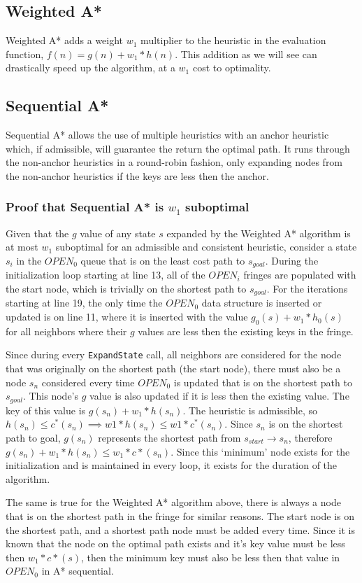 \documentclass[11pt,letter]{article}
\begin{document}
\subsection{Weighted A*}
Weighted A* adds a weight $w_1$ multiplier to the heuristic in the evaluation function, $f(n) = g(n) + w_1*h(n)$. This addition as we will see can drastically speed up the algorithm, at a $w_1$ cost to optimality.

\subsection{Sequential A*}

Sequential A* allows the use of multiple heuristics with an anchor heuristic which, if admissible, will guarantee the return the optimal path. It runs through the non-anchor heuristics in a round-robin fashion, only expanding nodes from the non-anchor heuristics if the keys are less then the anchor.

\subsubsection{Proof that Sequential A* is $w_1$ suboptimal}
\par Given that the $g$ value of any state $s$ expanded by the Weighted A* algorithm is at most $w_1$ suboptimal for an admissible and consistent heuristic, consider a state $s_i$ in the $OPEN_0$ queue that is on the least cost path to $s_{goal}$. 
During the initialization loop starting at line 13, all of the $OPEN_i$ fringes are populated with the start node, which is trivially on the shortest path to $s_{goal}$.
For the iterations starting at line 19, the only time the $OPEN_0$ data structure is inserted or updated is on line 11, where it is inserted with the value $g_0(s) + w_1*h_0(s)$ for all neighbors where their $g$ values are less then the existing keys in the fringe.
\\
\par Since during every \verb_ExpandState_ call, all neighbors are considered for the node that was originally on the shortest path (the start node), there must also be a node $s_{n}$ considered every time $OPEN_0$ is updated that is on the shortest path to $s_{goal}$. This node's $g$ value is also updated if it is less then the existing value. The key of this value is $g(s_n) + w_1*h(s_n)$. The heuristic is admissible, so $h(s_n) \leq c^*(s_n) \implies w1*h(s_n) \leq w1*c^*(s_n)$. Since $s_{n}$ is on the shortest path to goal, $g(s_n)$ represents the shortest path from $s_{start} \rightarrow s_n$, therefore $g(s_n) + w_1*h(s_n) \leq w_1*c*(s_n)$.
Since this `minimum' node exists for the initialization and is maintained in every loop, it exists for the duration of the algorithm.
\\
\par The same is true for the Weighted A* algorithm above, there is always a node that is on the shortest path in the fringe for similar reasons. The start node is on the shortest path, and a shortest path node must be added every time. Since it is known that the node on the optimal path exists and it's key value must be less then $w_1 * c*(s)$, then the minimum key must also be less then that value in $OPEN_0$ in A* sequential.
\end{document}
